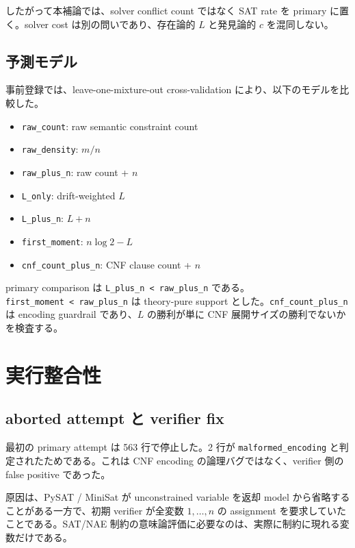\documentclass[12pt,a4paper]{article}
\begin{document}
したがって本補論では、solver conflict count ではなく SAT rate を primary に置く。solver cost は別の問いであり、存在論的 \(L\) と発見論的 \(c\) を混同しない。

\subsection{予測モデル}\label{ux4e88ux6e2cux30e2ux30c7ux30eb}

事前登録では、leave-one-mixture-out cross-validation により、以下のモデルを比較した。

\begin{itemize}
\tightlist
\item
  \texttt{raw\_count}: raw semantic constraint count
\item
  \texttt{raw\_density}: \(m/n\)
\item
  \texttt{raw\_plus\_n}: raw count + \(n\)
\item
  \texttt{L\_only}: drift-weighted \(L\)
\item
  \texttt{L\_plus\_n}: \(L+n\)
\item
  \texttt{first\_moment}: \(n\log2-L\)
\item
  \texttt{cnf\_count\_plus\_n}: CNF clause count + \(n\)
\end{itemize}

primary comparison は \texttt{L\_plus\_n\ \textless{}\ raw\_plus\_n} である。\texttt{first\_moment\ \textless{}\ raw\_plus\_n} は theory-pure support とした。\texttt{cnf\_count\_plus\_n} は encoding guardrail であり、\(L\) の勝利が単に CNF 展開サイズの勝利でないかを検査する。

\section{実行整合性}\label{ux5b9fux884cux6574ux5408ux6027}

\subsection{aborted attempt と verifier fix}\label{aborted-attempt-ux3068-verifier-fix}

最初の primary attempt は 563 行で停止した。2 行が \texttt{malformed\_encoding} と判定されたためである。これは CNF encoding の論理バグではなく、verifier 側の false positive であった。

原因は、PySAT / MiniSat が unconstrained variable を返却 model から省略することがある一方で、初期 verifier が全変数 \(1,\dots,n\) の assignment を要求していたことである。SAT/NAE 制約の意味論評価に必要なのは、実際に制約に現れる変数だけである。
\end{document}
